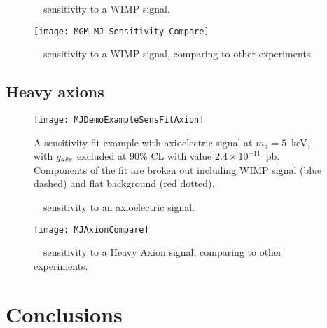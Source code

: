 			\begin{figure}
				\centering
				\def\figheight{0.41\textheight}				
				\caption[\MJ~\minmod~sensitivity to a WIMP signal]{\MJ~\minmod~sensitivity to a
				 WIMP signal.}
				\label{fig:MJSensitivityToWIMP}
			\end{figure}		
		
			\begin{figure}
				\centering
				\texttt{[image: MGM\_MJ\_Sensitivity\_Compare]}
				\caption[\MJ~\minmod~sensitivity to a WIMP signal, comparing to other experiments]
				{\MJ~\minmod~sensitivity to a WIMP signal, comparing to other experiments.}
				\label{fig:MJSensitivityToWIMPCompare}
			\end{figure}			
			
		\subsection{Heavy axions}
		\label{sec:MJSensitivityToAxions}
		
		
			\begin{figure}
				\centering
				\texttt{[image: MJDemoExampleSensFitAxion]}
				\caption[\MJ~\minmod axioelectric sensitivity fit example.]{A sensitivity fit example 
				with axioelectric signal at $m_{a}=5$~keV, with $g_{a\bar{e}e}$ excluded at 90\% CL with
				value
				 $2.4\times10^{-11}$~pb.  Components of the fit are broken out including WIMP 
				 signal (blue dashed) and flat background (red dotted).  }
				\label{fig:MJSensitivityToAxionExample}
			\end{figure}
	
			\begin{figure}
				\centering
				\def\figheight{0.41\textheight}
				\caption[\MJ~\minmod~sensitivity to an axioelectric signal]{
				\MJ~\minmod~sensitivity to an axioelectric signal.}
				\label{fig:MJSensitivityToAxion}
			\end{figure}	
					
			\begin{figure}
				\centering
				\texttt{[image: MJAxionCompare]}
				\caption{\MJ~\minmod~sensitivity to a Heavy Axion signal, comparing to other 
				experiments.}
				\label{fig:MJSensitivityToHeavyAxionsCompare}
			\end{figure}							

	\section{Conclusions}
	\label{sec:OtherLowEnergyConclusions}	